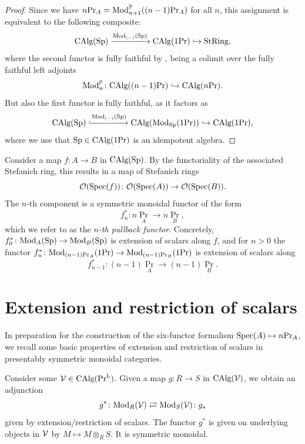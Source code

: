 \documentclass[11pt]{book}
\begin{document}
	\begin{proof}
		Since we have $n\textup{Pr}_A = {\textup{Mod}}^{\mathbb{P}}_{n+1}((n-1)\textup{Pr}_A)$ for all $n$, this assignment is equivalent to the following composite:
		\[
			{\textup{CAlg}}({\textup{Sp}}) \xrightarrow{{\textup{Mod}}_{(-)}({\textup{Sp}})} {\textup{CAlg}}(1\textup{Pr}) \hookrightarrow {\textup{StRing}},
		\]
		where the second functor is fully faithful by , being a colimit over the fully faithful left adjoints
		\[
			{\textup{Mod}}^{\mathbb{P}}_n\colon {\textup{CAlg}}((n-1)\textup{Pr}) \hookrightarrow {\textup{CAlg}}(n\textup{Pr}).
		\]
		But also the first functor is fully faithful, as it factors as
		\[
			{\textup{CAlg}}({\textup{Sp}}) \xhookrightarrow{{\textup{Mod}}_{(-)}({\textup{Sp}})} {\textup{CAlg}}({\textup{Mod}}_{{\textup{Sp}}}(1\textup{Pr})) \hookrightarrow {\textup{CAlg}}(1\textup{Pr}),
		\]
		where we use that ${\textup{Sp}} \in {\textup{CAlg}}(1\textup{Pr})$ is an idempotent algebra.
	\end{proof}
	
	\begin{notation}
		Consider a map $f\colon A \to B$ in ${\textup{CAlg}}({\textup{Sp}})$. By the functoriality of the associated Stefanich ring, this results in a map of Stefanich rings
		\[
			\mathcal{O}(\operatorname{Spec}(f))\colon \mathcal{O}(\operatorname{Spec}(A)) \to \mathcal{O}(\operatorname{Spec}(B)).
		\]
		The $n$-th component is a symmetric monoidal functor of the form
		\[
			f_n^*\colon n\Pr_A \to n\Pr_B,
		\]
		which we refer to as the \emph{$n$-th pullback functor}. Concretely, $f_0^*\colon {\textup{Mod}}_A({\textup{Sp}}) \to {\textup{Mod}}_B({\textup{Sp}})$ is extension of scalars along $f$, and for $n > 0$ the functor $f_n^*\colon {\textup{Mod}}_{(n-1)\textup{Pr}_A}(1\textup{Pr}) \to {\textup{Mod}}_{(n-1)\textup{Pr}_B}(1\textup{Pr})$ is extension of scalars along
		\[
			f_{n-1}^*\colon (n-1)\Pr_A \to (n-1)\Pr_B.
		\]
	\end{notation}

	\section{Extension and restriction of scalars}

	In preparation for the construction of the six-functor formalism $\operatorname{Spec}(A) \mapsto n\textup{Pr}_A$, we recall some basic properties of extension and restriction of scalars in presentably symmetric monoidal categories.

	Consider some $\mathcal{V} \in {\textup{CAlg}}(\textup{Pr}^{\textup{L}})$. Given a map $g\colon R \to S$ in ${\textup{CAlg}}(\mathcal{V})$, we obtain an adjunction
	\[
		g^*\colon {\textup{Mod}}_R(\mathcal{V}) \rightleftarrows {\textup{Mod}}_S(\mathcal{V}) \colon g_*
	\]
	given by extension/restriction of scalars. The functor $g^*$ is given on underlying objects in $\mathcal{V}$ by $M \mapsto M \otimes_R S$. It is symmetric monoidal.
\end{document}
